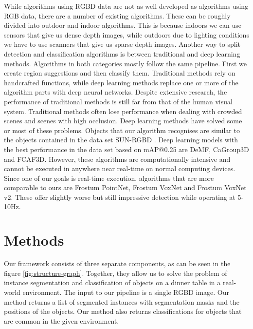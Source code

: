 \documentclass[10pt,twocolumn,letterpaper]{article}
\begin{document}
While algorithms using RGBD data are not as well developed as algorithms using RGB data, there are a number of existing algorithms\cite{Wang_Wang_Long_Gu_Li_2021}. These can be roughly divided into outdoor and indoor algorithms. This is because indoors we can use sensors that give us dense depth images, while outdoors due to lighting conditions we have to use scanners that give us sparse depth images. Another way to split detection and classification algorithms is between traditional and deep learning methods. Algorithms in both categories mostly follow the same pipeline. First we create region suggestions and then classify them. Traditional methods rely on handcrafted functions, while deep learning methods replace one or more of the algorithm parts with deep neural networks. Despite extensive research, the performance of traditional methods is still far from that of the human visual system. Traditional methods often lose performance when dealing with crowded scenes and scenes with high occlusion. Deep learning methods have solved some or most of these problems. Objects that our algorithm recognises are similar to the objects contained in the data set SUN-RGBD\cite{7298655} \cite{SUNRGBDweb}. Deep learning models with the best performance in the data set based on mAP@0.25 are DeMF\cite{DeMF}, CaGroup3D\cite{CAGroup3D} and FCAF3D\cite{FCAF3D}. However, these algorithms are computationally intensive and cannot be executed in anywhere near real-time on normal computing devices. Since one of our goals is real-time execution, algorithms that are more comparable to ours are Frostum PointNet\cite{Qi_Liu_Wu_Su_Guibas_2018}, Frostum VoxNet\cite{Shen_Stamos_2020a} and Frostum VoxNet v2\cite{Shen_Stamos_2021}. These offer slightly worse but still impressive detection while operating at 5-10Hz.

\section{Methods}


\begin{figure*}
\begin{center}
\end{center}
   \caption{Full proposed framework pipeline.}
\label{fig:structure-graph}
\end{figure*}



Our framework consists of three separate components, as can be seen in the figure \ref{fig:structure-graph}. Together, they allow us to solve the problem of instance segmentation and classification of objects on a dinner table in a real-world environment. The input to our pipeline is a single RGBD image. Our method returns a list of segmented instances with segmentation masks and the positions of the objects. Our method also returns classifications for objects that are common in the given environment.
\end{document}
